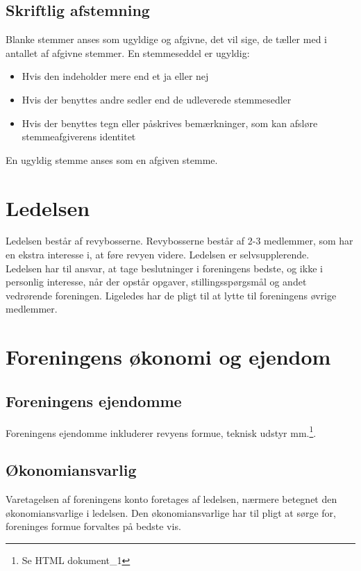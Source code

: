\documentclass[a4paper,11pt,danish]{article}
\begin{document}
\subsection{Skriftlig afstemning}
Blanke stemmer anses som ugyldige og afgivne, det vil sige, de tæller med i antallet af afgivne stemmer. 
En stemmeseddel er ugyldig: 

\begin{itemize}
\item Hvis den indeholder mere end et ja eller nej
\item Hvis der benyttes andre sedler end de udleverede stemmesedler
\item Hvis der benyttes tegn eller påskrives bemærkninger, som kan afsløre stemmeafgiverens identitet
\end{itemize}

\noindent En ugyldig stemme anses som en afgiven stemme.

\section{Ledelsen}
Ledelsen består af revybosserne. Revybosserne består af 2-3 medlemmer, som har en ekstra interesse i, at føre revyen videre. Ledelsen er selvsupplerende.\\

\noindent Ledelsen har til ansvar, at tage beslutninger i foreningens bedste, og ikke i personlig interesse, når der opstår opgaver, stillingsspørgsmål og andet vedrørende foreningen. Ligeledes har de pligt til at lytte til foreningens øvrige medlemmer. \\

\section{Foreningens økonomi og ejendom}
\subsection{Foreningens ejendomme}
Foreningens ejendomme inkluderer revyens formue, teknisk udstyr mm.\footnote{Se HTML dokument\_1}.

\subsection{Økonomiansvarlig}
Varetagelsen af foreningens konto foretages af ledelsen, nærmere betegnet den økonomiansvarlige i ledelsen. Den økonomiansvarlige har til pligt at sørge for, foreninges formue forvaltes på bedste vis. \\
\end{document}
